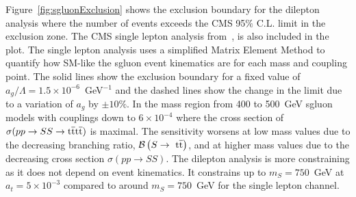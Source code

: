 


Figure~\ref{fig:sgluonExclusion} shows the exclusion boundary for the dilepton analysis where the number of events exceeds the CMS 95$\%$ C.L. limit in the exclusion zone. The CMS single lepton analysis from~\cite{Chatrchyan:2013fea,Beck201548}, is also included in the plot. The single lepton analysis uses a simplified Matrix Element Method to quantify how SM-like the sgluon event kinematics are for each mass and coupling point. The solid lines show the exclusion boundary for a fixed value of $a_{g}/\Lambda = 1.5 \times 10^{-6}$~GeV$^{-1}$ and the dashed lines show the change in the limit due to a variation of $a_{g}$ by $\pm 10\%$. 
In the mass region from 400 to 500~GeV sgluon models with couplings down to $6\times10^{-4}$ where the cross section of $\sigma( pp \rightarrow SS \rightarrow \mathrm{t}\overline{\mathrm{t}}\mathrm{t}\overline{\mathrm{t}})$ is 
maximal. The sensitivity worsens at low mass values due to the decreasing branching ratio, $\mathcal{B}\left(S\rightarrow~\mathrm{t}\overline{\mathrm{t}} \right)$, and at higher mass values due to the decreasing cross section $\sigma( pp \rightarrow SS)$.
The dilepton analysis is more constraining as it does not depend on event kinematics. It constrains up to $ m_{S} = 750$~GeV at $a_t=5\times10^{-3}$ compared to around $ m_{S} = 750$~GeV for the single lepton channel.

